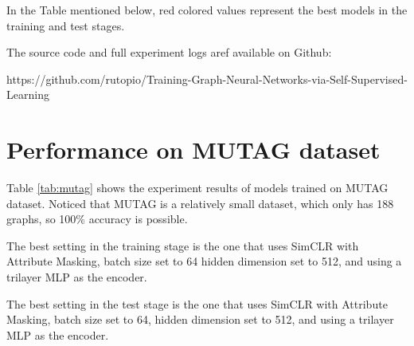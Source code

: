 

In the Table mentioned below, red colored values represent the best models in the training and test stages.

The source code and full experiment logs aref available on Github:

https://github.com/rutopio/Training-Graph-Neural-Networks-via-Self-Supervised-Learning


\section{Performance on MUTAG dataset}

Table \ref{tab:mutag} shows the experiment results of models trained on MUTAG dataset. Noticed that MUTAG is a relatively small dataset, which only has 188 graphs, so 100\% accuracy is possible. 

The best setting in the training stage is the one that uses SimCLR with Attribute Masking, batch size set to 64 hidden dimension set to 512, and using a trilayer MLP as the encoder.

The best setting in the test stage is the one that uses SimCLR with Attribute Masking, batch size set to 64, hidden dimension set to 512, and using a trilayer MLP as the encoder.




